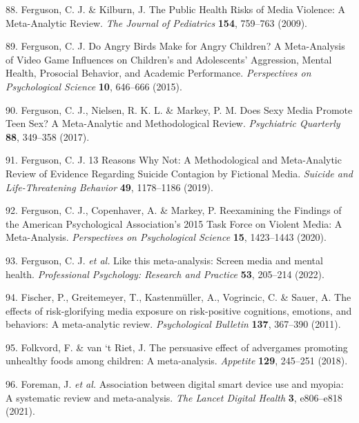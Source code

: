 \documentclass[
  english,
  man]{apa6}
\newenvironment{cslreferences}%
  {}%
  {\par}
\begin{document}
\begin{cslreferences}
\leavevmode\hypertarget{ref-fergusonPublicHealthRisks2009}{}%
88. Ferguson, C. J. \& Kilburn, J. The Public Health Risks of Media Violence: A Meta-Analytic Review. \emph{The Journal of Pediatrics} \textbf{154}, 759--763 (2009).

\leavevmode\hypertarget{ref-fergusonAngryBirdsMake2015}{}%
89. Ferguson, C. J. Do Angry Birds Make for Angry Children? A Meta-Analysis of Video Game Influences on Children's and Adolescents' Aggression, Mental Health, Prosocial Behavior, and Academic Performance. \emph{Perspectives on Psychological Science} \textbf{10}, 646--666 (2015).

\leavevmode\hypertarget{ref-fergusonDoesSexyMedia2017}{}%
90. Ferguson, C. J., Nielsen, R. K. L. \& Markey, P. M. Does Sexy Media Promote Teen Sex? A Meta-Analytic and Methodological Review. \emph{Psychiatric Quarterly} \textbf{88}, 349--358 (2017).

\leavevmode\hypertarget{ref-ferguson13ReasonsWhy2019}{}%
91. Ferguson, C. J. 13 Reasons Why Not: A Methodological and Meta-Analytic Review of Evidence Regarding Suicide Contagion by Fictional Media. \emph{Suicide and Life-Threatening Behavior} \textbf{49}, 1178--1186 (2019).

\leavevmode\hypertarget{ref-fergusonReexaminingFindingsAmerican2020}{}%
92. Ferguson, C. J., Copenhaver, A. \& Markey, P. Reexamining the Findings of the American Psychological Association's 2015 Task Force on Violent Media: A Meta-Analysis. \emph{Perspectives on Psychological Science} \textbf{15}, 1423--1443 (2020).

\leavevmode\hypertarget{ref-fergusonThisMetaanalysisScreen2022}{}%
93. Ferguson, C. J. \emph{et al.} Like this meta-analysis: Screen media and mental health. \emph{Professional Psychology: Research and Practice} \textbf{53}, 205--214 (2022).

\leavevmode\hypertarget{ref-fischerEffectsRiskglorifyingMedia2011}{}%
94. Fischer, P., Greitemeyer, T., Kastenmüller, A., Vogrincic, C. \& Sauer, A. The effects of risk-glorifying media exposure on risk-positive cognitions, emotions, and behaviors: A meta-analytic review. \emph{Psychological Bulletin} \textbf{137}, 367--390 (2011).

\leavevmode\hypertarget{ref-folkvordPersuasiveEffectAdvergames2018}{}%
95. Folkvord, F. \& van `t Riet, J. The persuasive effect of advergames promoting unhealthy foods among children: A meta-analysis. \emph{Appetite} \textbf{129}, 245--251 (2018).

\leavevmode\hypertarget{ref-foremanAssociationDigitalSmart2021}{}%
96. Foreman, J. \emph{et al.} Association between digital smart device use and myopia: A systematic review and meta-analysis. \emph{The Lancet Digital Health} \textbf{3}, e806--e818 (2021).


\end{cslreferences}
\end{document}
